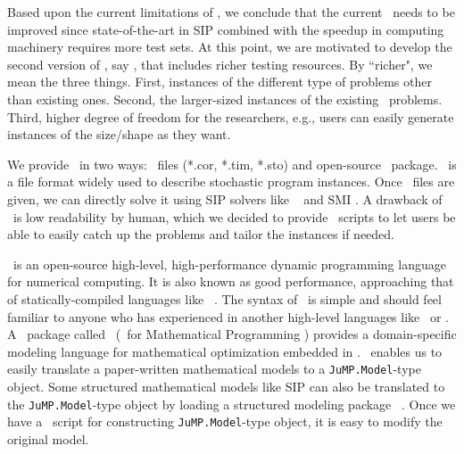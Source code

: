 Based upon the current limitations of \siplib, we conclude that the current \siplib\ needs to be improved since state-of-the-art in SIP combined with the speedup in computing machinery requires more test sets. At this point, we are motivated to develop the second version of \siplib, say \siplibtwo, that includes richer testing resources. By ``richer", we mean the three things. First, instances of the different type of problems other than existing ones. Second, the larger-sized instances of the existing \siplib\ problems. Third, higher degree of freedom for the researchers, e.g., users can easily generate instances of the size/shape as they want.

We provide \siplibtwo\ in two ways: \smps\ files (*.cor, *.tim, *.sto) and open-source \julia\ package. \smps\ is a file format widely used to describe stochastic program instances. Once \smps\ files are given, we can directly solve it using SIP solvers like \dsp\ \cite{journal:KZ2015} and \textsf{SMI} \cite{web:SMI}. A drawback of \smps\ is low readability by human, which we decided to provide \julia\ scripts to let users be able to easily catch up the problems and tailor the instances if needed.

\julia\ is an open-source high-level, high-performance dynamic programming language for numerical computing. It is also known as good performance, approaching that of statically-compiled languages like \clang\ \cite{journal:BEKS2017}. The syntax of \julia\ is simple and should feel familiar to anyone who has experienced in another high-level languages like \matlab\ or \python. A \julia\ package called \jump\ (\julia\ for Mathematical Programming \cite{journal:JuMP}) provides a domain-specific modeling language for mathematical optimization embedded in \julia. \jump\ enables us to easily translate a paper-written mathematical models to a \texttt{JuMP.Model}-type object. Some structured mathematical models like SIP can also be translated to the \texttt{JuMP.Model}-type object by loading a structured modeling package \structjump\ \cite{web:StructJuMP}. Once we have a \julia\ script for constructing \texttt{JuMP.Model}-type object, it is easy to modify the original model. %

